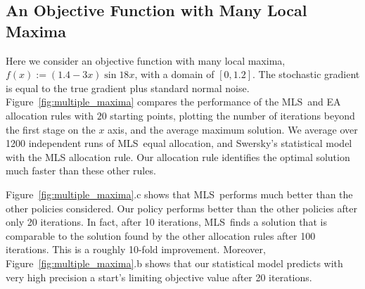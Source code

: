 \documentclass[12pt,english]{article}
\newcommand{\stedit}[1]{{\color{blue} #1}}
\newcommand{\abbrv}{MLS}
\begin{document}
\subsection{An Objective Function with Many Local Maxima}
\label{local_maximum}
Here we consider an objective function with many local maxima, $f(x):=(1.4-3x)\sin{18x}$, with a domain of $[0,1.2]$. The stochastic gradient is equal to the true gradient plus standard normal noise.
Figure~\ref{fig:multiple_maxima} compares the performance of the \abbrv\ and EA allocation rules with $20$ starting points, plotting the number of iterations beyond the first stage on the $x$ axis, and the average maximum solution. We average over 1200 independent runs of \abbrv\, equal allocation, and Swersky's statistical model with the MLS allocation rule. Our allocation rule identifies the optimal solution much faster than these other rules.

\stedit{Figure~\ref{fig:multiple_maxima}.c shows that \abbrv\ performs much better than the other policies considered. Our policy performs better than the other policies after only 20 iterations. In fact, after 10 iterations, \abbrv\ finds a solution that is comparable to the solution found by the other allocation rules after 100 iterations. This is a roughly 10-fold improvement. Moreover, Figure~\ref{fig:multiple_maxima}.b shows that our statistical model predicts with very high precision a start's limiting objective value after 20 iterations.}

\end{document}
